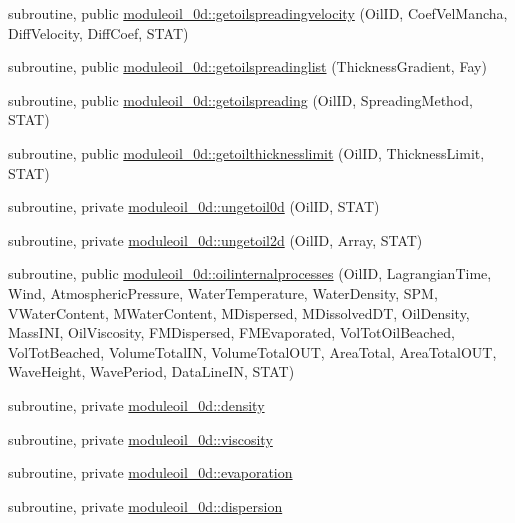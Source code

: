 \begin{DoxyCompactItemize}
\item 
subroutine, public \mbox{\hyperlink{namespacemoduleoil__0d_a2eecd31ffeaa8edcf98841c8c93d7fb2}{moduleoil\+\_\+0d\+::getoilspreadingvelocity}} (Oil\+ID, Coef\+Vel\+Mancha, Diff\+Velocity, Diff\+Coef, S\+T\+AT)
\item 
subroutine, public \mbox{\hyperlink{namespacemoduleoil__0d_af81162169a4b962122c4de881bf62957}{moduleoil\+\_\+0d\+::getoilspreadinglist}} (Thickness\+Gradient, Fay)
\item 
subroutine, public \mbox{\hyperlink{namespacemoduleoil__0d_af99e71581dc3e88eb79bbabd1712077d}{moduleoil\+\_\+0d\+::getoilspreading}} (Oil\+ID, Spreading\+Method, S\+T\+AT)
\item 
subroutine, public \mbox{\hyperlink{namespacemoduleoil__0d_addd445bd0b4ba520f5e73d1d711ce3c6}{moduleoil\+\_\+0d\+::getoilthicknesslimit}} (Oil\+ID, Thickness\+Limit, S\+T\+AT)
\item 
subroutine, private \mbox{\hyperlink{namespacemoduleoil__0d_a5e491438effacee8f245a2f293ac1cd5}{moduleoil\+\_\+0d\+::ungetoil0d}} (Oil\+ID, S\+T\+AT)
\item 
subroutine, private \mbox{\hyperlink{namespacemoduleoil__0d_a2a561dff5ba878c524c927808595b674}{moduleoil\+\_\+0d\+::ungetoil2d}} (Oil\+ID, Array, S\+T\+AT)
\item 
subroutine, public \mbox{\hyperlink{namespacemoduleoil__0d_acfea99e694d76e1358d2a688a3d50d98}{moduleoil\+\_\+0d\+::oilinternalprocesses}} (Oil\+ID, Lagrangian\+Time, Wind, Atmospheric\+Pressure, Water\+Temperature, Water\+Density, S\+PM, V\+Water\+Content, M\+Water\+Content, M\+Dispersed, M\+Dissolved\+DT, Oil\+Density, Mass\+I\+NI, Oil\+Viscosity, F\+M\+Dispersed, F\+M\+Evaporated, Vol\+Tot\+Oil\+Beached, Vol\+Tot\+Beached, Volume\+Total\+IN, Volume\+Total\+O\+UT, Area\+Total, Area\+Total\+O\+UT, Wave\+Height, Wave\+Period, Data\+Line\+IN, S\+T\+AT)
\item 
subroutine, private \mbox{\hyperlink{namespacemoduleoil__0d_a365dbbed79663b6925c5964691b6fae2}{moduleoil\+\_\+0d\+::density}}
\item 
subroutine, private \mbox{\hyperlink{namespacemoduleoil__0d_aed2374d490605ee4791762d23340c037}{moduleoil\+\_\+0d\+::viscosity}}
\item 
subroutine, private \mbox{\hyperlink{namespacemoduleoil__0d_ae6b04a828d4410d4e96bd3d91b7287a1}{moduleoil\+\_\+0d\+::evaporation}}
\item 
subroutine, private \mbox{\hyperlink{namespacemoduleoil__0d_acebfecd3789a27099dd53ae338cb4b64}{moduleoil\+\_\+0d\+::dispersion}}

\end{DoxyCompactItemize}
